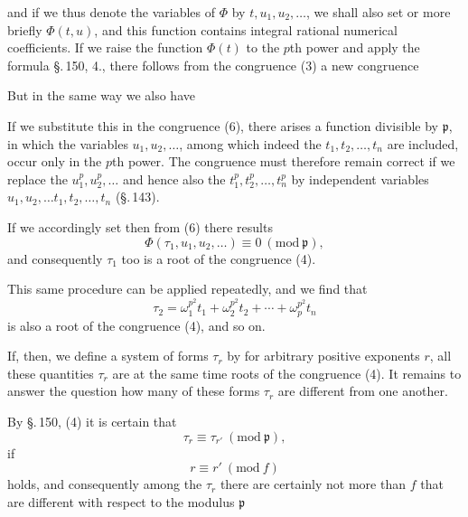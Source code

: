 and if we thus denote the variables of $\Phi$ by $t, u_1, u_2,
\ldots$, we shall also set
or more briefly $\Phi(t, u)$, and this function contains integral
rational numerical coefficients. If we raise the function $\Phi(t)$
to the $p$th power and apply the formula \S.\,150, 4., there follows
from the congruence (3) a new congruence

But in the same way we also have

If we substitute this in the congruence (6), there arises a
function divisible by $\mathfrak p$, in which the variables
$u_1, u_2, \ldots$, among which indeed the $t_1, t_2, \ldots, t_n$
are included, occur only in the $p$th power. The congruence must
therefore remain correct if we replace the $u_1^p, u_2^p,
\ldots$ and hence also the $t_1^p, t_2^p, \ldots, t_n^p$ by
independent variables $u_1, u_2, \ldots t_1, t_2, \ldots, t_n$
(\S.\,143).

If we accordingly set
then from (6) there results
\[
\Phi(\tau_1, u_1, u_2, \ldots) \equiv 0\ (\mathrm{mod}\ \mathfrak p),
\]
and consequently $\tau_1$ too is a root of the congruence (4).

This same procedure can be applied repeatedly, and we find
that
\[
\tau_2 = \omega_1^{p^2} t_1 + \omega_2^{p^2} t_2 + \cdots + \omega_p^{p^2} t_n %
\]
is also a root of the congruence (4), and so on.

If, then, we
define a system of forms $\tau_r$ by
for arbitrary positive exponents $r$, all these quantities
$\tau_r$ are at the same time roots of the congruence (4). It
remains to answer the question how many of these forms $\tau_r$
are different from one another.

By \S.\,150, (4) it is certain that
\[
\tau_r \equiv \tau_{r'}\ (\mathrm{mod}\ \mathfrak p),
\]
if
\[
r \equiv r'\ (\mathrm{mod}\ f)
\]
holds, and consequently among the $\tau_r$ there are certainly not
more than $f$ that are different with respect to the modulus $\mathfrak p$
